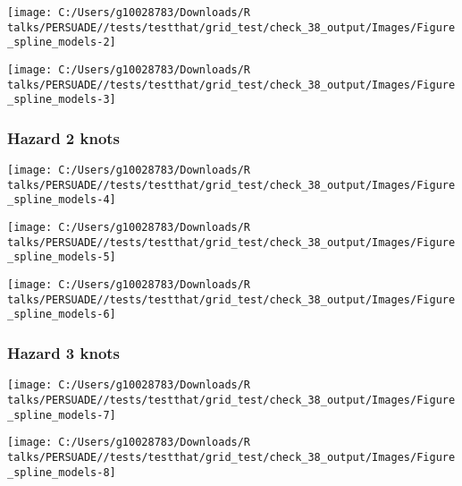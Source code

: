 \documentclass[
]{article}
\begin{document}
\begin{flushleft}\texttt{[image: C:/Users/g10028783/Downloads/R talks/PERSUADE//tests/testthat/grid\_test/check\_38\_output/Images/Figure\_spline\_models-2]} \end{flushleft}

\begin{flushleft}\texttt{[image: C:/Users/g10028783/Downloads/R talks/PERSUADE//tests/testthat/grid\_test/check\_38\_output/Images/Figure\_spline\_models-3]} \end{flushleft}

\clearpage

\subsubsection{Hazard 2 knots}\label{hazard-2-knots}

\begin{flushleft}\texttt{[image: C:/Users/g10028783/Downloads/R talks/PERSUADE//tests/testthat/grid\_test/check\_38\_output/Images/Figure\_spline\_models-4]} \end{flushleft}

\begin{flushleft}\texttt{[image: C:/Users/g10028783/Downloads/R talks/PERSUADE//tests/testthat/grid\_test/check\_38\_output/Images/Figure\_spline\_models-5]} \end{flushleft}

\begin{flushleft}\texttt{[image: C:/Users/g10028783/Downloads/R talks/PERSUADE//tests/testthat/grid\_test/check\_38\_output/Images/Figure\_spline\_models-6]} \end{flushleft}

\clearpage

\subsubsection{Hazard 3 knots}\label{hazard-3-knots}

\begin{flushleft}\texttt{[image: C:/Users/g10028783/Downloads/R talks/PERSUADE//tests/testthat/grid\_test/check\_38\_output/Images/Figure\_spline\_models-7]} \end{flushleft}

\begin{flushleft}\texttt{[image: C:/Users/g10028783/Downloads/R talks/PERSUADE//tests/testthat/grid\_test/check\_38\_output/Images/Figure\_spline\_models-8]} \end{flushleft}
\end{document}
